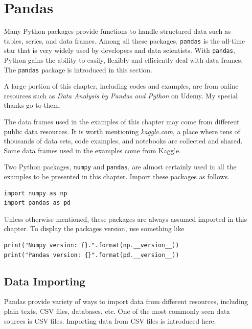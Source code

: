\section{Pandas} \label{sec:pandas}

Many Python packages provide functions to handle structured data such as tables, series, and data frames. Among all these packages, \verb|pandas| is the all-time star that is very widely used by developers and data scientists. With \verb|pandas|, Python gains the ability to easily, flexibly and efficiently deal with data frames. The \verb|pandas| package is introduced in this section.

A large portion of this chapter, including codes and examples, are from online resources such as \textit{Data Analysis by Pandas and Python} on Udemy. My special thanks go to them.

The data frames used in the examples of this chapter may come from different public data resources. It is worth mentioning \textit{kaggle.com}, a place where tens of thousands of data sets, code examples, and notebooks are collected and shared. Some data frames used in the examples come from Kaggle.

Two Python packages, \verb|numpy| and \verb|pandas|, are almost certainly used in all the examples to be presented in this chapter. Import these packages as follows.
\begin{lstlisting}
import numpy as np
import pandas as pd
\end{lstlisting}
Unless otherwise mentioned, these packages are always assumed imported in this chapter. To display the packages version, use something like
\begin{lstlisting}
print("Numpy version: {}.".format(np.__version__))
print("Pandas version: {}".format(pd.__version__))
\end{lstlisting}

\subsection{Data Importing}

Pandas provide variety of ways to import data from different resources, including plain texts, CSV files, databases, etc. One of the most commonly seen data sources is CSV files. Importing data from CSV files is introduced here.

